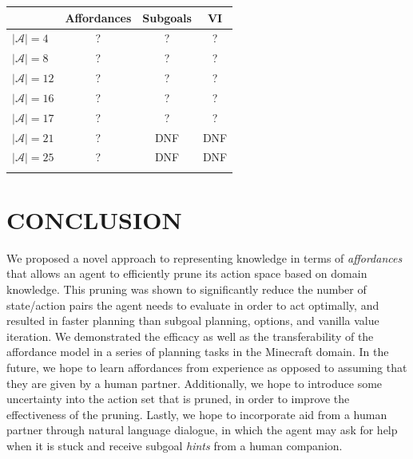 \documentclass[]{article}
\begin{document}
\vspace{4 mm}

\begin{tabular}{ l || c | c | c }
  & Affordances & Subgoals & VI \\
  \hline
  $|\mathcal{A}| = 4$ & ? & ? & ?  \\
  $|\mathcal{A}| = 8$ & ? & ? & ?  \\
  $|\mathcal{A}| = 12$ & ? & ? & ?  \\
  $|\mathcal{A}| = 16$ & ? & ? & ?  \\
  $|\mathcal{A}| = 17$ & ? & ? & ?  \\
  $|\mathcal{A}| = 21$ & ? & DNF & DNF  \\
  $|\mathcal{A}| = 25$ & ? & DNF & DNF  \\
    \label{results_2}
\end{tabular}

\section{CONCLUSION}

We proposed a novel approach to representing
knowledge in terms of {\em
  affordances}~\citep{gibson77} that allows an agent to efficiently prune its
action space based on domain knowledge. This pruning was shown to significantly
reduce the number of state/action pairs the agent needs to evaluate
in order to act optimally, and resulted in faster planning than subgoal planning, options,
and vanilla value iteration. We demonstrated the efficacy as well as the 
transferability of the affordance model in a series of planning tasks in the Minecraft domain.
In the future, we hope to learn affordances from experience as opposed to assuming
that they are given by a human partner. Additionally, we hope to introduce some uncertainty
into the action set that is pruned, in order to improve the effectiveness of the pruning. Lastly,
we hope to incorporate aid from a human partner through natural language dialogue, in which
the agent may ask for help when it is stuck and receive subgoal {\it hints} from a human
companion.


  
\end{document}

